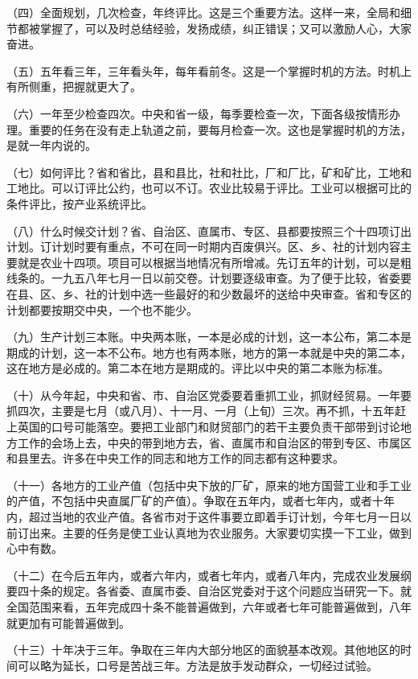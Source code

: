 （四）全面规划，几次检查，年终评比。这是三个重要方法。这样一来，全局和细节都被掌握了，可以及时总结经验，发扬成绩，纠正错误；又可以激励人心，大家奋进。

（五）五年看三年，三年看头年，每年看前冬。这是一个掌握时机的方法。时机上有所侧重，把握就更大了。

（六）一年至少检查四次。中央和省一级，每季要检查一次，下面各级按情形办理。重要的任务在没有走上轨道之前，要每月检查一次。这也是掌握时机的方法，是就一年内说的。

（七）如何评比？省和省比，县和县比，社和社比，厂和厂比，矿和矿比，工地和工地比。可以订评比公约，也可以不订。农业比较易于评比。工业可以根据可比的条件评比，按产业系统评比。

（八）什么时候交计划？省、自治区、直属市、专区、县都要按照三个十四项订出计划。订计划时要有重点，不可在同一时期内百废俱兴。区、乡、社的计划内容主要就是农业十四项。项目可以根据当地情况有所增减。先订五年的计划，可以是粗线条的。一九五八年七月一日以前交卷。计划要逐级审查。为了便于比较，省委要在县、区、乡、社的计划中选一些最好的和少数最坏的送给中央审查。省和专区的计划都要按期交中央，一个也不能少。

（九）生产计划三本账。中央两本账，一本是必成的计划，这一本公布，第二本是期成的计划，这一本不公布。地方也有两本账，地方的第一本就是中央的第二本，这在地方是必成的。第二本在地方是期成的。评比以中央的第二本账为标准。

（十）从今年起，中央和省、市、自治区党委要着重抓工业，抓财经贸易。一年要抓四次，主要是七月（或八月）、十一月、一月（上旬）三次。再不抓，十五年赶上英国的口号可能落空。要把工业部门和财贸部门的若干主要负责干部带到讨论地方工作的会场上去，中央的带到地方去，省、直属市和自治区的带到专区、市属区和县里去。许多在中央工作的同志和地方工作的同志都有这种要求。

（十一）各地方的工业产值（包括中央下放的厂矿，原来的地方国营工业和手工业的产值，不包括中央直属厂矿的产值）。争取在五年内，或者七年内，或者十年内，超过当地的农业产值。各省市对于这件事要立即着手订计划，今年七月一日以前订出来。主要的任务是使工业认真地为农业服务。大家要切实摸一下工业，做到心中有数。

（十二）在今后五年内，或者六年内，或者七年内，或者八年内，完成农业发展纲要四十条的规定。各省委、直属市委、自治区党委对于这个问题应当研究一下。就全国范围来看，五年完成四十条不能普遍做到，六年或者七年可能普遍做到，八年就更加有可能普遍做到。

（十三）十年决于三年。争取在三年内大部分地区的面貌基本改观。其他地区的时间可以略为延长，口号是苦战三年。方法是放手发动群众，一切经过试验。

